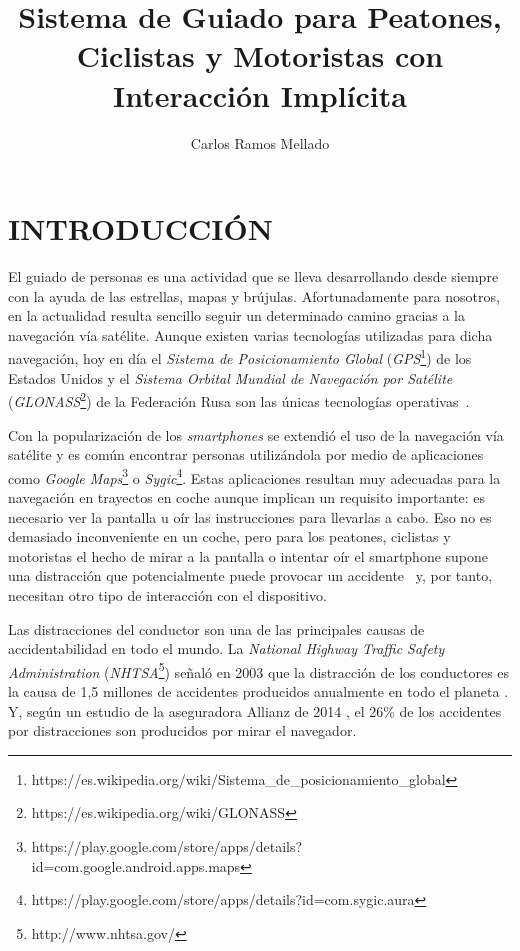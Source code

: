 \documentclass{pre-tfg}
\title{Sistema de Guiado para Peatones, Ciclistas y Motoristas con Interacción Implícita}
\author{Carlos Ramos Mellado}
\begin{document}
\maketitle
\tableofcontents

\newpage

\section{INTRODUCCIÓN}

El guiado de personas es una actividad que se lleva desarrollando desde siempre con la
ayuda de las estrellas, mapas y brújulas. Afortunadamente para nosotros, en la actualidad
resulta sencillo seguir un determinado camino gracias a la navegación vía satélite. Aunque
existen varias tecnologías utilizadas para dicha navegación, hoy en día el \textit{Sistema
  de Posicionamiento Global}
(\textit{GPS}\footnote{https://es.wikipedia.org/wiki/Sistema\_de\_posicionamiento\_global})
de los Estados Unidos y el \textit{Sistema Orbital Mundial de Navegación por Satélite}
(\textit{GLONASS}\footnote{https://es.wikipedia.org/wiki/GLONASS}) de la Federación Rusa
son las únicas tecnologías operativas~\cite{SPSA}.

Con la popularización de los \emph{smartphones} se extendió el uso de la navegación vía
satélite y es común encontrar personas utilizándola por medio de aplicaciones como
\textit{Google
  Maps}\footnote{https://play.google.com/store/apps/details?id=com.google.android.apps.maps}
o
\textit{Sygic}\footnote{https://play.google.com/store/apps/details?id=com.sygic.aura}. Estas
aplicaciones resultan muy adecuadas para la navegación en trayectos en coche aunque
implican un requisito importante: es necesario ver la pantalla u oír las instrucciones
para llevarlas a cabo. Eso no es demasiado inconveniente en un coche, pero para los peatones,
ciclistas y motoristas el hecho de mirar a la pantalla o intentar oír el smartphone supone
una distracción que potencialmente puede provocar un accidente~\cite{Valcarcel12} y, por
tanto, necesitan otro tipo de interacción con el dispositivo.

Las distracciones del conductor son una de las principales causas de accidentabilidad en todo el mundo. La \textit{National Highway Traffic Safety Administration} (\textit{NHTSA}\footnote{http://www.nhtsa.gov/}) señaló en 2003 que la distracción de los conductores es la causa de 1,5 millones de accidentes producidos anualmente en todo el planeta \cite{RACC03}. Y, según un estudio de la aseguradora Allianz de 2014 \cite{Allianz14}, el 26\% de los accidentes por distracciones son producidos por mirar el navegador.
\end{document}
